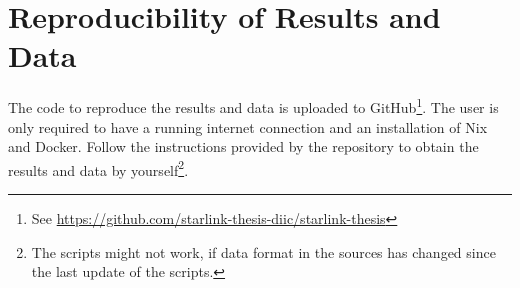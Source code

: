 \section{Reproducibility of Results and Data} \label{sec:reproducibility}

The code to reproduce the results and data is uploaded to GitHub\footnote{See
	\url{https://github.com/starlink-thesis-diic/starlink-thesis}}. The
user is only required to have a running internet connection and an installation
of Nix and Docker. Follow the instructions provided by the repository to obtain
the results and data by yourself\footnote{The scripts might not work, if data
	format in the sources has changed since the last update of the
	scripts.}.
